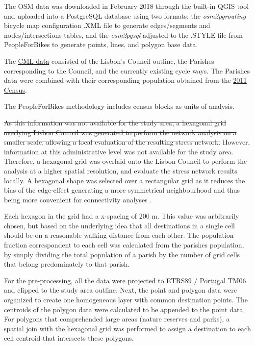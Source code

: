 \documentclass[information,article,submit,moreauthors,pdftex,10pt,a4paper]{mdpi}
\theoremstyle{mdpi}
\newcounter{ex}
\newcounter{re}
\theoremstyle{mdpidefinition}
\begin{document}
The OSM data was downloaded in February 2018 through the built-in QGIS tool and uploaded into a PostgreSQL database using two formats: the \textit{osm2pgrouting} bicycle map
configuration .XML file to generate edges/segments and nodes/intersections tables, and the \textit{osm2pgsql} adjusted to the .STYLE file from PeopleForBikes to generate points, lines, and polygon base data. 

The \href{http://geodados.cm-lisboa.pt/}{CML data} consisted of the Lisbon's Council outline, the Parishes corresponding to the Council, and the currently existing cycle ways. The Parishes data were combined with their corresponding population obtained from the \href{http://censos.ine.pt/}{2011 Census}. 

The PeopleForBikes methodology includes census blocks as units of analysis. \begin{mycolorbox}[colback=yellow]
\sout{As this information was not available for the study area, a hexagonal grid overlying Lisbon Council was generated to perform the network analysis on a smaller scale, allowing a local evaluation of the resulting stress network.} However, information at this administrative level was not available for the study area. Therefore, a hexagonal grid was overlaid onto the Lisbon Council to perform the analysis at a higher spatial resolution, and evaluate the stress network results locally. A hexagonal shape was selected over a rectangular grid as it reduces the bias of the edge-effect generating a more symmetrical neighbourhood and thus being more convenient for connectivity analyses \cite{Birch2007}.
\end{mycolorbox} Each hexagon in the grid had a x-spacing of 200 m. This value was arbitrarily chosen, but based on the underlying idea that all destinations in a single cell should be on a reasonable walking distance from each other. The population fraction correspondent to each cell was calculated from the parishes population, by simply dividing the total population of a parish by the number of grid cells that belong predominately to that parish.

For the pre-processing, all the data were projected to ETRS89 / Portugal TM06 and clipped to the study area outline. Next, the point and polygon data were organized to create one homogeneous layer with common destination points. The centroids of the polygon data were calculated to be appended to the point data. For polygons that comprehended large areas (nature reserves and parks), a spatial join with the hexagonal grid was performed to assign a destination to each cell centroid that intersects these polygons.
\end{document}
